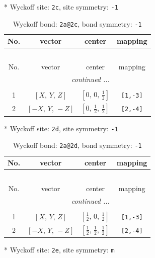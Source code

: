 \documentclass[fleqn,8pt]{jsarticle}
\begin{document}
* Wyckoff site: {\tt 2c}, site symmetry: {\tt -1}
\renewcommand{\arraystretch}{1.2}
\begin{longtable}{cccc}
\caption{Wyckoff bond: {\tt 2a@2c}, bond symmetry: {\tt -1}}
 \\
 \hline \hline
No. & vector & center & mapping \\ \hline \endfirsthead

\multicolumn{3}{l}{\tablename\ \thetable{}} \\
 \hline \hline
No. & vector & center & mapping \\ \hline \endhead

 \hline \hline
\multicolumn{3}{r}{\footnotesize\it continued ...} \\ \endfoot

 \hline \hline
\multicolumn{3}{r}{} \\ \endlastfoot

1 & $\left[ X,\, Y,\, Z \right]$ & $\left[ 0,\, 0,\, \frac{1}{2} \right]$ & {\tt [1,-3]} \\ \hline
2 & $\left[ - X,\, Y,\, - Z \right]$ & $\left[ 0,\, \frac{1}{2},\, \frac{1}{2} \right]$ & {\tt [2,-4]} \\
\end{longtable}
* Wyckoff site: {\tt 2d}, site symmetry: {\tt -1}
\renewcommand{\arraystretch}{1.2}
\begin{longtable}{cccc}
\caption{Wyckoff bond: {\tt 2a@2d}, bond symmetry: {\tt -1}}
 \\
 \hline \hline
No. & vector & center & mapping \\ \hline \endfirsthead

\multicolumn{3}{l}{\tablename\ \thetable{}} \\
 \hline \hline
No. & vector & center & mapping \\ \hline \endhead

 \hline \hline
\multicolumn{3}{r}{\footnotesize\it continued ...} \\ \endfoot

 \hline \hline
\multicolumn{3}{r}{} \\ \endlastfoot

1 & $\left[ X,\, Y,\, Z \right]$ & $\left[ \frac{1}{2},\, 0,\, \frac{1}{2} \right]$ & {\tt [1,-3]} \\ \hline
2 & $\left[ - X,\, Y,\, - Z \right]$ & $\left[ \frac{1}{2},\, \frac{1}{2},\, \frac{1}{2} \right]$ & {\tt [2,-4]} \\
\end{longtable}
* Wyckoff site: {\tt 2e}, site symmetry: {\tt m}
\end{document}
